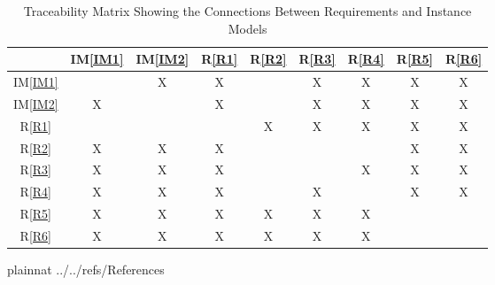 \documentclass[12pt]{article}
\newcommand{\iref}[1]{IM\ref{#1}}
\newcommand{\rref}[1]{R\ref{#1}}
\begin{document}
\begin{table}[h!]
  \centering
  \begin{tabular}{|c|c|c|c|c|c|c|c|c|}
    \hline
               & \iref{IM1} & \iref{IM2} & \rref{R1} & \rref{R2} & \rref{R3} & \rref{R4} & \rref{R5} & \rref{R6} \\
    \hline
    \iref{IM1} &            & X          & X         &           & X         & X         & X         & X         \\ \hline
    \iref{IM2} & X          &            & X         &           & X         & X         & X         & X         \\ \hline
    \rref{R1}  &            &            &           & X         & X         & X         & X         & X         \\ \hline
    \rref{R2}  & X          & X          & X         &           &           &           & X         & X         \\ \hline
    \rref{R3}  & X          & X          & X         &           &           & X         & X         & X         \\ \hline
    \rref{R4}  & X          & X          & X         &           & X         &           & X         & X         \\ \hline
    \rref{R5}  & X          & X          & X         & X         & X         & X         &           &           \\ \hline
    \rref{R6}  & X          & X          & X         & X         & X         & X         &           &           \\ \hline
  \end{tabular}
  \caption{Traceability Matrix Showing the Connections Between Requirements and Instance Models}
  \label{Table:R_trace}
\end{table}



\newpage

 {plainnat}
 {../../refs/References}
\end{document}

